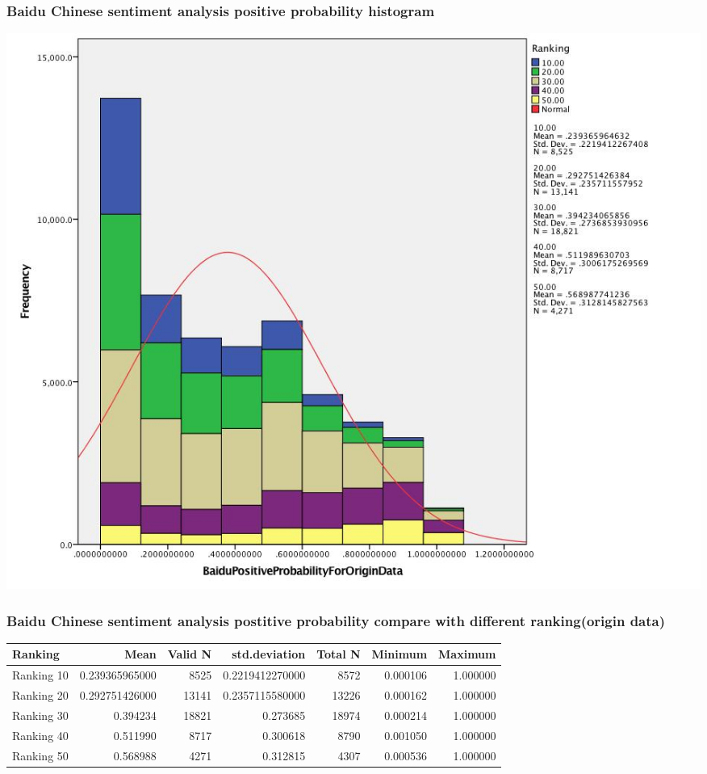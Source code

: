 \subsubsection{Baidu Chinese sentiment analysis positive probability histogram}
\label{sec:org749c9a0}
\begin{center}
\includegraphics[width=.9\linewidth]{./img/BaiduPositiveProbababilityHistogramForOriginData.jpg}
\end{center}

\subsubsection{Baidu Chinese sentiment analysis postitive probability compare with different ranking(origin data)}
\label{sec:org2a96a0f}
\begin{center}
\begin{tabular}{lrrrrrr}
Ranking & Mean & Valid N & std.deviation & Total N & Minimum & Maximum\\
\hline
Ranking 10 & 0.239365965000 & 8525 & 0.2219412270000 & 8572 & 0.000106 & 1.000000\\
Ranking 20 & 0.292751426000 & 13141 & 0.2357115580000 & 13226 & 0.000162 & 1.000000\\
Ranking 30 & 0.394234 & 18821 & 0.273685 & 18974 & 0.000214 & 1.000000\\
Ranking 40 & 0.511990 & 8717 & 0.300618 & 8790 & 0.001050 & 1.000000\\
Ranking 50 & 0.568988 & 4271 & 0.312815 & 4307 & 0.000536 & 1.000000\\
\end{tabular}
\end{center}


